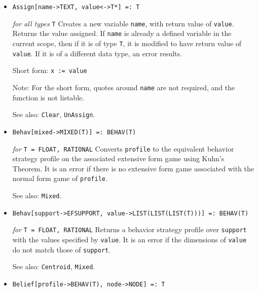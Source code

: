 \begin{itemize}
\item{} 
\protect \large \begin{verbatim}
Assign[name->TEXT, value<->T*] =: T
\end{verbatim} \normalsize

{\it for all types} {\tt T} 
\bd 
Creates a new variable \verb+name+, with return value of \verb+value+.
Returns the value assigned.  If \verb+name+ is already a defined
variable in the current scope, then if it is of type \verb+T+, it is
modified to have return value of \verb+value+.  If it is of a
different data type, an error results.
 
\item [Short form:] \verb+x := value+
\item [Note:] For the short form, quotes around \verb+name+ are not
required, and the function is not listable.
\item [See also:] \verb+Clear+, \verb+UnAssign+.
\ed


\item{}
\protect \large \begin{verbatim}
Behav[mixed->MIXED(T)] =: BEHAV(T)
\end{verbatim}\normalsize

{\it for} {\tt T = FLOAT, RATIONAL}
\bd
Converts \verb+profile+ to the equivalent behavior strategy profile on the
associated extensive form game using Kuhn's Theorem.  It is an error
if there is no extensive form game associated with the normal form game
of \verb+profile+.
\item [See also:] \verb+Mixed+.
\ed

\item{}
\protect \large \begin{verbatim}
Behav[support->EFSUPPORT, value->LIST(LIST(LIST(T)))] =: BEHAV(T)
\end{verbatim}\normalsize

{\it for} {\tt T = FLOAT, RATIONAL}
\bd
Returns a behavior strategy profile over \verb+support+ with the
values specified by \verb+value+.  It is an error if the dimensions of
\verb+value+ do not match those of \verb+support+.
\item [See also:] \verb+Centroid+, \verb+Mixed+.
\ed

\item{}
\protect \large \begin{verbatim}
Belief[profile->BEHAV(T), node->NODE] =: T
\end{verbatim}\normalsize


\end{itemize}
